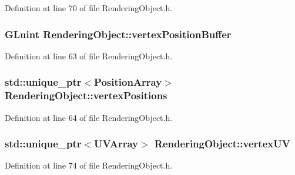 Definition at line 70 of file Rendering\+Object.\+h.

\hypertarget{class_rendering_object_a473f623b39157288bef992e76ddc45a9}{}
\subsubsection[{vertex\+Position\+Buffer}]{\setlength{\rightskip}{0pt plus 5cm}G\+Luint Rendering\+Object\+::vertex\+Position\+Buffer\hspace{0.3cm}{\ttfamily [protected]}}\label{class_rendering_object_a473f623b39157288bef992e76ddc45a9}


Definition at line 63 of file Rendering\+Object.\+h.

\hypertarget{class_rendering_object_a14721712672d0421ed72a394e3131da0}{}
\subsubsection[{vertex\+Positions}]{\setlength{\rightskip}{0pt plus 5cm}std\+::unique\+\_\+ptr$<${\bf Position\+Array}$>$ Rendering\+Object\+::vertex\+Positions\hspace{0.3cm}{\ttfamily [protected]}}\label{class_rendering_object_a14721712672d0421ed72a394e3131da0}


Definition at line 64 of file Rendering\+Object.\+h.

\hypertarget{class_rendering_object_afc405316bddec4ba1d5c228ecc0d9061}{}
\subsubsection[{vertex\+U\+V}]{\setlength{\rightskip}{0pt plus 5cm}std\+::unique\+\_\+ptr$<${\bf U\+V\+Array}$>$ Rendering\+Object\+::vertex\+U\+V\hspace{0.3cm}{\ttfamily [protected]}}\label{class_rendering_object_afc405316bddec4ba1d5c228ecc0d9061}


Definition at line 74 of file Rendering\+Object.\+h.

\hypertarget{class_rendering_object_ad583c70014e3f6ab0c9b62ea3c96ad25}{}
